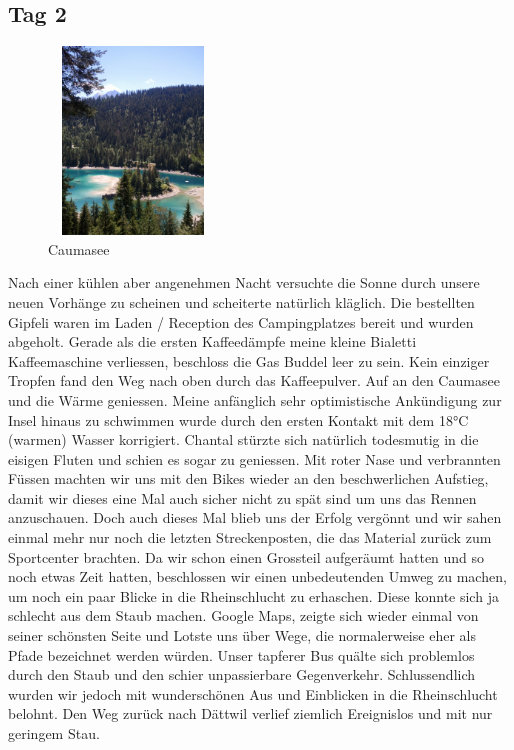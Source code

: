 \subsection{Tag 2}

\begin{figure} 
  \begin{centering}
    \includegraphics[width=0.4\textwidth, height=5cm, keepaspectratio]{../Bilder/Flims/21.jpg}
    \caption{Caumasee}
  \end{centering}
\end{figure} 

Nach einer kühlen aber angenehmen Nacht versuchte die Sonne durch unsere neuen Vorhänge zu scheinen und scheiterte natürlich kläglich.
Die bestellten Gipfeli waren im Laden / Reception des Campingplatzes bereit und wurden abgeholt.
Gerade als die ersten Kaffeedämpfe meine kleine Bialetti Kaffeemaschine verliessen, beschloss die Gas Buddel leer zu sein.
Kein einziger Tropfen fand den Weg nach oben durch das Kaffeepulver.
Auf an den Caumasee und die Wärme geniessen.
Meine anfänglich sehr optimistische Ankündigung zur Insel hinaus zu schwimmen wurde durch den ersten Kontakt mit dem 18°C (warmen) Wasser korrigiert.
Chantal stürzte sich natürlich todesmutig in die eisigen Fluten und schien es sogar zu geniessen.
Mit roter Nase und verbrannten Füssen machten wir uns mit den Bikes wieder an den beschwerlichen Aufstieg, damit wir dieses eine Mal auch sicher nicht zu spät sind um uns das Rennen anzuschauen.
Doch auch dieses Mal blieb uns der Erfolg vergönnt und wir sahen einmal mehr nur noch die letzten Streckenposten, die das Material zurück zum Sportcenter brachten.
Da wir schon einen Grossteil aufgeräumt hatten und so noch etwas Zeit hatten, beschlossen wir einen unbedeutenden Umweg zu machen, um noch ein paar Blicke in die Rheinschlucht zu erhaschen.
Diese konnte sich ja schlecht aus dem Staub machen.
Google Maps, zeigte sich wieder einmal von seiner schönsten Seite und Lotste uns über Wege, die normalerweise eher als Pfade bezeichnet werden würden.
Unser tapferer Bus quälte sich problemlos durch den Staub und den schier unpassierbare Gegenverkehr.
Schlussendlich wurden wir jedoch mit wunderschönen Aus und Einblicken in die Rheinschlucht belohnt.
Den Weg zurück nach Dättwil verlief ziemlich Ereignislos und mit nur geringem Stau.


